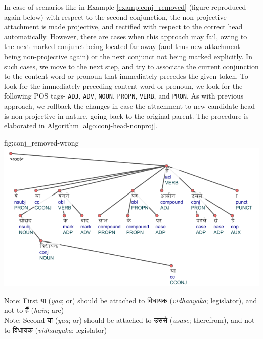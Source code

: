 In case of scenarios like in Example \ref{examp:conj_removed} (figure reproduced again below) with respect to the second conjunction, the non-projective attachment is made projective, and rectified with respect to the correct head automatically. However, there are cases when this approach may fail, owing to the next marked conjunct being located far away (and thus new attachment being non-projective again) or the next conjunct not being marked explicitly. In such cases, we move to the next step, and try to associate the current conjunction to the content word or pronoun that immediately precedes the given token. To look for the immediately preceding content word or pronoun, we look for the following POS tags- \verb|ADJ|, \verb|ADV|, \verb|NOUN|, \verb|PROPN|, \verb|VERB|, and \verb|PRON|. As with previous approach, we rollback the changes in case the attachment to new candidate head is non-projective in nature, going back to the original parent. The procedure is elaborated in Algorithm \ref{algo:conj-head-nonproj}.

\begin{reusefigure}[H]{fig:conj_removed-wrong}
    \centering
    \includegraphics[scale=0.85]{img/removed-conj-wrong.png}
    \caption{Original Annotation for Example \ref{examp:conj_removed}}
    Note: First \texthindi{या} (\textit{yaa}; or) should be attached to \texthindi{विधायक} (\textit{vidhaayaka}; legislator), and not to \texthindi{हैं} (\textit{hain}; are)\\
  Note: Second \texthindi{या} (\textit{yaa}; or) should be attached to \texthindi{उससे} (\textit{usase}; therefrom), and not to \texthindi{विधायक} (\textit{vidhaayaka}; legislator)
\end{reusefigure}


